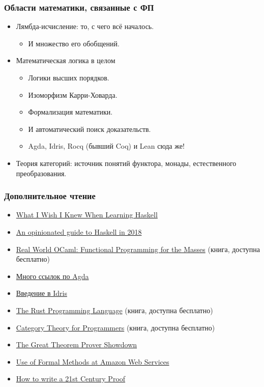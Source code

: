 \documentclass[11pt]{beamer}
\begin{document}
\begin{frame}[fragile]
  \frametitle{Области математики, связанные с ФП}
  \begin{itemize}
    \item Лямбда-исчисление: то, с чего всё началось.
          \begin{itemize}
            \item И множество его обобщений.
          \end{itemize}
          \pause
    \item Математическая логика в целом
          \begin{itemize}
            \item Логики высших порядков.
            \item Изоморфизм Карри-Ховарда.
            \item Формализация математики.
            \item И автоматический поиск доказательств.
            \item Agda, Idris, Rocq (бывший Coq) и Lean сюда же!
          \end{itemize}
          \pause
    \item Теория категорий: источник понятий функтора, монады, естественного преобразования.
  \end{itemize}
\end{frame}


\begin{frame}[fragile]
  \frametitle{Дополнительное чтение}
  \begin{itemize}
    \item \href{http://dev.stephendiehl.com/hask/}{What I Wish I Knew When Learning Haskell}
    \item \href{https://lexi-lambda.github.io/blog/2018/02/10/an-opinionated-guide-to-haskell-in-2018/}{An opinionated guide to Haskell in 2018}
    \item \href{https://realworldocaml.org/}{Real World OCaml: Functional Programming for the Masses} (книга, доступна бесплатно)
    \item \href{https://wiki.portal.chalmers.se/agda/pmwiki.php?n=Main.Documentation}{Много ссылок по Agda}
    \item \href{http://docs.idris-lang.org/en/latest/tutorial/index.html}{Введение в Idris}
    \item \href{https://doc.rust-lang.org/book/}{The Rust Programming Language} (книга, доступна бесплатно)
    \item \href{https://github.com/hmemcpy/milewski-ctfp-pdf}{Category Theory for Programmers} (книга, доступна бесплатно)
    \item \href{https://www.hillelwayne.com/post/theorem-prover-showdown/}{The Great Theorem Prover Showdown}
    \item \href{https://blog.acolyer.org/2014/11/24/use-of-formal-methods-at-amazon-web-services/}{Use of Formal Methods at Amazon Web Services}
    \item \href{https://blog.acolyer.org/2015/01/12/how-to-write-a-21st-century-proof/}{How to write a 21st Century Proof}
  \end{itemize}
\end{frame}
\end{document}
